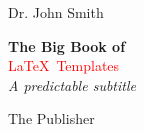 \begin{titlepage} %

	\raggedleft %
	
	\vspace*{\baselineskip} %
	
	
	{\Large Dr. John Smith} %
	
	\vspace*{0.167\textheight} %
	
	
	\textbf{\LARGE The Big Book of}\\[\baselineskip] %
	
	{\textcolor{Red}{\Huge \LaTeX ~Templates}}\\[\baselineskip] %
	
	{\Large \textit{A predictable subtitle}} %
	
	\vfill %
	
	
	{\large The Publisher~~\plogo} %
	
	\vspace*{3\baselineskip} %

\end{titlepage}



